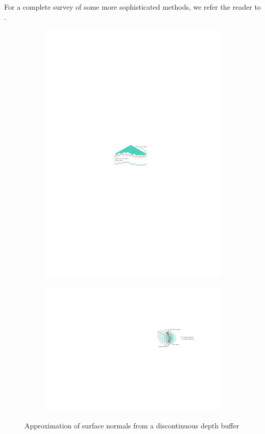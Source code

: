 For a complete survey of some more sophisticated methods, we refer the reader to \cite{yagel92}.

\begin{figure}[b]
\centering
\begin{subfigure}{.4\textwidth}
  \centering
  \includegraphics[scale=1.2]{figures/normals.pdf}
  \caption{}
  \label{fig:normals-depth}
\end{subfigure}%
\begin{subfigure}{.6\textwidth}
  \centering
  \includegraphics[scale=1.2]{figures/normal-approx.pdf}
  \caption{}
  \label{fig:normals-approx}
\end{subfigure}
\caption{Approximation of surface normals from a discontinuous depth buffer}
\label{fig:normals}
\end{figure}